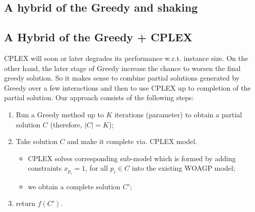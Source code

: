 \documentclass[runningheads,a4paper]{llncs}
\begin{document}
    \subsection{A hybrid of the Greedy and shaking}
    \subsection{A Hybrid of the Greedy + CPLEX}
        CPLEX will soon or later degrades its performance w.r.t. instance size. On the other hand, the later stage of Greedy increase the chance to worsen the final greedy solution.  So it makes sense to combine  partial solutions generated by  Greedy over a few interactions  and then to use CPLEX up to completion of the partial solution. Our approach consists of the following steps:
        \begin{enumerate}
        	\item Run a Greedy method up to $K$ iterations (parameter) to obtain a partial solution $C$ (therefore, $|C| = K$); 
        	\item Take solution $C$ and make it complete via. CPLEX model. 
        	\begin{itemize}
        		\item CPLEX solves corresponding sub-model which is formed by adding constraints $x_{p_i} = 1$, for all $p_i \in C$ into the existing WOAGP model;
        		\item we obtain a complete solution $C'$;
        	\end{itemize}
            \item return $f(C')$. 
        \end{enumerate}
      \begin{comment}
      
       \noindent \textbf{Improvements of the above method.} The above method can serve as a basic iteration 
       of a more advanced techniques like ILP-LNS or CMSA. In this case, methods for destructing the solutions 
       has to be proposed.  Underlying idea could be:
       \begin{itemize}
       	    \item remove $N$ guards with the largest costs out of $C'$
       	    \item remove $N$ guards which have a higher amount of points from $D(P)$ covered by other guards, represented by the function
       	    \begin{align}
       	       ratio(i) = \frac{\sum_{v \in V\setminus{ \{i\}}, j \in V(i)} 1_{j \mbox{ is veasible from } v} }{|V(i)|}. 
       	    \end{align}
       \end{itemize}
      \end{comment}     
    
\end{document}
